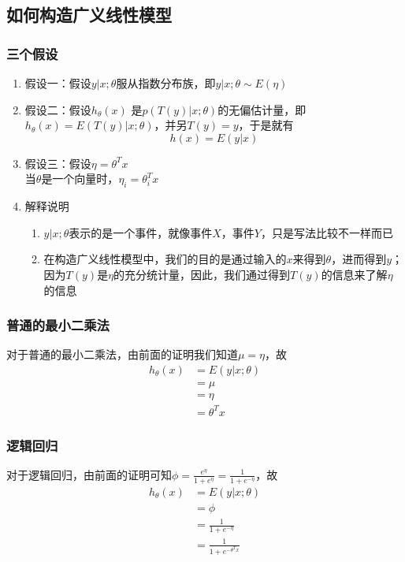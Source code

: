 \subsection{如何构造广义线性模型}
\subsubsection{三个假设}
\begin{enumerate}
	\item 假设一：假设$y|x; \theta$服从指数分布族，即$y|x; \theta \sim E(\eta)$
	\item 假设二：假设$h_\theta(x)$ 是$p\left(T(y)|x; \theta\right)$的无偏估计量，即$h_\theta(x)=E\left(T(y)|x; \theta\right)$，并另$T(y)=y$，于是就有
	\begin{equation}
		h(x) = E(y|x)
	\end{equation}
	{\color{red}{暂时对此假设不怎么理解，待后续理解后补充}}
	\item 假设三：假设$\eta = \theta^Tx$ \\
	当$\theta$是一个向量时，$\eta_i = \theta_i^Tx$
	\item 解释说明
	\begin{enumerate}
		\item $y|x; \theta$表示的是一个事件，就像事件$X$，事件$Y$，只是写法比较不一样而已
		\item 在构造广义线性模型中，我们的目的是通过输入的$x$来得到$\theta$，进而得到$y$；因为$T(y)$是$\eta$的充分统计量，因此，我们通过得到$T(y)$的信息来了解$\eta$的信息{\color{red}{（此条正确性待查）}}
	\end{enumerate}
\end{enumerate}

\subsubsection{普通的最小二乘法}
对于普通的最小二乘法，由前面的证明我们知道$\mu = \eta$，故
\begin{equation}\begin{aligned}
	h_\theta(x) &= E(y|x;\theta) \\
	&= \mu \\
	&= \eta \\
	&= \theta^T x
\end{aligned}\end{equation}

\subsubsection{逻辑回归}
对于逻辑回归，由前面的证明可知$\phi=\frac{e^{\eta}}{1+e^{\eta}} = \frac{1}{1+e^{-\eta}}$，故
\begin{equation}\begin{aligned}
	h_\theta(x) &= E(y|x; \theta) \\
	&= \phi \\
	&= \frac{1}{1+e^{-\eta}} \\
	&= \frac{1}{1+e^{-\theta^Tx}}
\end{aligned}\end{equation}


